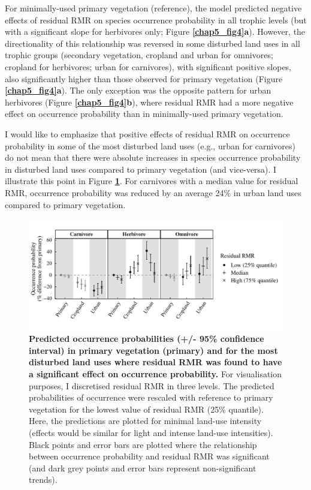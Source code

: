 \clearpage

For minimally-used primary vegetation (reference), the model predicted negative effects of residual RMR on species occurrence probability in all trophic levels (but with a significant slope for herbivores only; Figure \textbf{\ref{chap5_fig4}a}). However, the directionality of this relationship was reversed in some disturbed land uses in all trophic groups (secondary vegetation, cropland and urban for omnivores; cropland for herbivores; urban for carnivores), with significant positive slopes, also significantly higher than those observed for primary vegetation (Figure \textbf{\ref{chap5_fig4}a}). The only exception was the opposite pattern for urban herbivores (Figure \textbf{\ref{chap5_fig4}b}), where residual RMR had a more negative effect on occurrence probability than in minimally-used primary vegetation.

I would like to emphasize that positive effects of residual RMR on occurrence probability in some of the most disturbed land uses (e.g., urban for carnivores) do not mean that there were absolute increases in species occurrence probability in disturbed land uses compared to primary vegetation (and vice-versa). I illustrate this point in Figure \textbf{\ref{chap5_fig5}}. For carnivores with a median value for residual RMR, occurrence probability was reduced by an average 24\% in urban land uses compared to primary vegetation. 

\begin{figure}[h!]
\centering
\includegraphics[scale=0.65]{figures/Chapter5/Figure5}
\caption[Predicted occurrence probabilities in primary vegetation and for the most disturbed land uses where residual RMR was found to have a significant effect on occurrence probability]{\textbf{Predicted occurrence probabilities (+/- 95\% confidence interval) in primary vegetation (primary) and for the most disturbed land uses where residual RMR was found to have a significant effect on occurrence probability.} For visualisation purposes, I discretised residual RMR in three levels. The predicted probabilities of occurrence were rescaled with reference to primary vegetation for the lowest value of residual RMR (25\% quantile). Here, the predictions are plotted for minimal land-use intensity (effects would be similar for light and intense land-use intensities). Black points and error bars are plotted where the relationship between occurrence probability and residual RMR was significant (and dark grey points and error bars represent non-significant trends).}
\label{chap5_fig5}
\end{figure}

